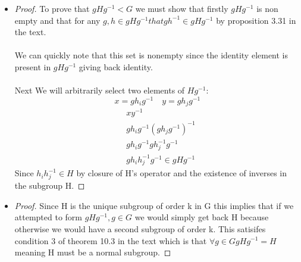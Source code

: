 \documentclass[11pt]{article}
\theoremstyle{definition}  %
\begin{document}
   \begin{itemize}
     \item
     \begin{proof}
       To prove that $gHg^{-1}<G$ we must show that firstly $gHg^{-1}$ is non empty and that for any $g,h\in gHg^{-1} that gh^{-1}\in gHg^{-1}$ by proposition 3.31 in the text. \\\\
       We can quickly note that this set is nonempty since the identity element is present in $gHg^{-1}$ giving back identity.\\\\
       Next We will arbitrarily select two elements of $Hg^{-1}$:
       \[
         x=gh_ig^{-1}\quad y=gh_jg^{-1}
       \]
       \begin{align*}
         &xy^{-1}\\
         &gh_ig^{-1}(gh_jg^{-1})^{-1}\\
         &gh_ig^{-1}gh_j^{-1}g^{-1}\\
         &gh_ih_j^{-1}g^{-1}\in gHg^{-1}
       \end{align*}
       Since $h_ih_j^{-1}\in H$ by closure of H's operator and the existence of inverses in the subgroup H.
     \end{proof}
     \item

     \begin{proof}
       Since H is the unique subgroup of order k in G this implies that if we attempted to form $gHg^{-1}, g\in G$ we would simply get back H because otherwise we would have a second subgroup of order k. This satisifes condition 3 of theorem 10.3 in the text which is that $\forall g\in G gHg^{-1}=H$ meaning H must be a normal subgroup.
     \end{proof}
   \end{itemize}
\end{document}
